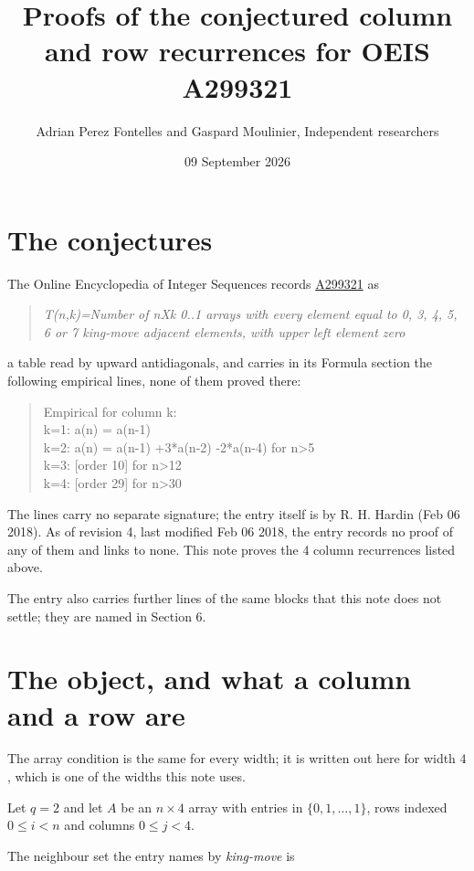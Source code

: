 \documentclass[11pt]{article}
\title{Proofs of the conjectured column and row recurrences for OEIS A299321}
\author{Adrian Perez Fontelles and Gaspard Moulinier, Independent researchers}
\date{09 September 2026}
\theoremstyle{definition}
\begin{document}
\maketitle
\section{The conjectures}

The Online Encyclopedia of Integer Sequences records \href{https://oeis.org/A299321}{A299321} as

\begin{quote}\itshape T(n,k)=Number of nXk 0..1 arrays with every element equal to 0, 3, 4, 5, 6 or 7 king-move adjacent elements, with upper left element zero\end{quote}

a table read by upward antidiagonals, and carries in its Formula section the following empirical lines, none of them proved there:

\begin{quote}\ttfamily Empirical for column k:\\
k=1: a(n) = a(n-1)\\k=2: a(n) = a(n-1) +3*a(n-2) -2*a(n-4) for n>5\\k=3: [order 10] for n>12\\k=4: [order 29] for n>30\end{quote}

The lines carry no separate signature; the entry itself is by R. H. Hardin (Feb 06 2018). As of revision 4, last modified Feb 06 2018, the entry records no proof of any of them and links to none. This note proves the 4 column recurrences listed above.

The entry also carries further lines of the same blocks that this note does not settle; they are named in Section 6.

\section{The object, and what a column and a row are}

The array condition is the same for every width; it is written out here for width $4$, which is one of the widths this note uses.

Let $q = 2$ and let $A$ be an $n \times 4$ array with entries in $\{0,1,\dots,1\}$, rows indexed $0 \le i < n$ and columns $0 \le j < 4$.

The neighbour set the entry names by {\itshape king-move} is
\end{document}
